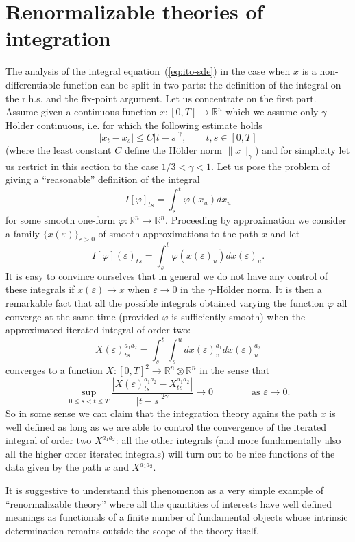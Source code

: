 \documentclass[a4paper]{article}
\newcommand{\1}{{\bf 1}}
\newcommand{\eps}{\varepsilon}
\newcommand{\RR}{\mathbb{R}}
\newcommand{\RR}{\mathbb{R}}
\newcommand{\eps}{\varepsilon}
\begin{document}
\section{Renormalizable theories of integration} 
\label{sec:ren}

The analysis of the integral equation~(\ref{eq:ito-sde}) in the case
when $x$ is a non-differentiable function can be split
in two parts: the definition of the integral on the r.h.s. and the
fix-point argument. Let us concentrate on the first part. Assume given
a continuous function $x: [0,T] \to \RR^n$ which we assume only
$\gamma$-H\"older continuous, i.e. for which the following estimate holds
$$
|x_t-x_s| \le C |t-s|^\gamma, \qquad t,s \in [0,T]
$$
(where the least constant $C$ define the H\"older norm $\|x\|_\gamma$)
and for simplicity let us restrict in this section to the case $1/3 < \gamma < 1$.
Let us pose the problem of giving a ``reasonable'' definition of
the integral
$$
I[\varphi]_{ts} = \int_s^t \varphi(x_u) dx_u 
$$
for some smooth one-form $\varphi : \RR^n \to \RR^n$. Proceeding
by approximation we consider a family $\{x(\eps)\}_{\eps > 0}$ of
smooth approximations to the path $x$ and let
$$
I[\varphi](\eps)_{ts} = \int_s^t \varphi(x(\eps)_u) dx(\eps)_u. 
$$
It is easy to convince ourselves that in general we do not have any
control of these integrals if $x(\eps) \to x$ when $\eps \to 0$ in the
$\gamma$-H\"older norm. It is then a remarkable fact that all the
possible integrals obtained varying the function $\varphi$ all
converge at the same time (provided $\varphi$ is sufficiently smooth)
when the approximated iterated integral of order two:
$$
X(\eps)^{a_1 a_2}_{ts} = \int_s^t \int_s^u
dx(\eps)^{a_1}_v dx(\eps)^{a_2}_u
$$
converges to a function $X : [0,T]^2 \to
\RR^n \otimes \RR^n$ in the sense that
$$
\sup_{0 \le s < t \le T}\frac{|X(\eps)^{a_1
    a_2}_{ts}-X^{a_1 a_2}_{ts}|}{|t-s|^{2\gamma}} 
\to 0\qquad \qquad \text{as $\eps \to 0$.}
$$
So in some sense we can claim that the integration theory agains the
path $x$ is well defined as long as we are able to control the
convergence of the iterated integral of order two $X^{a_1 a_2}$: all the other
integrals (and more fundamentally also all the higher order iterated
integrals) will turn out to be nice functions of the data given by the
path $x$ and $X^{a_1 a_2}$. 

It is suggestive to understand this phenomenon as a very simple
example of ``renormalizable theory'' where all the quantities of
interests have well defined meanings as functionals of a finite number of
fundamental objects whose intrinsic determination remains outside the scope of the
theory itself.
\end{document}
